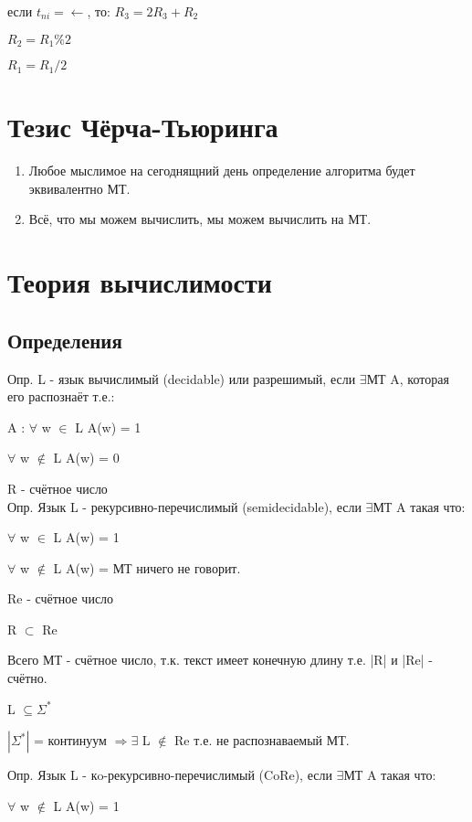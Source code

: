 \documentclass{scrartcl}
\begin{document}
если $t_{ni} = \leftarrow$, то: $R_3 = 2R_3 + R_2$

\hspace*{30mm}$R_2 = R_1 \% 2$

\hspace*{30mm}$R_1 = R_1 / 2$

\section{Тезис Чёрча-Тьюринга}
\begin{enumerate}
\item Любое мыслимое на сегоднящний день определение алгоритма будет эквивалентно МТ.
\item Всё, что мы можем вычислить, мы можем вычислить на МТ.
\end{enumerate}

\section{Теория вычислимости}
\subsection{Определения}

Опр. L - язык вычислимый (decidable) или разрешимый, если $\exists$МТ A, которая его распознаёт т.е.:

A : $\forall$ w $\in$ L A(w) = 1

\hspace*{6,5mm}$\forall$ w $\not\in$ L A(w) = 0

R - счётное число\\
Опр. Язык L - рекурсивно-перечислимый (semidecidable), если $\exists$МТ A такая что:

$\forall$ w $\in$ L A(w) = 1

$\forall$ w $\not\in$ L A(w) = МТ ничего не говорит.

Re - счётное число

R $\subset$ Re

Всего МТ - счётное число, т.к. текст имеет конечную длину т.е. |R| и |Re| - счётно.

L $\subseteq \Sigma^*$ 

$|\Sigma^*|$ = континуум $\Rightarrow \exists$ L $\not\in$ Re т.е. не распознаваемый МТ.

Опр. Язык L - кo-рекурсивно-перечислимый (CoRe), если $\exists$МТ A такая что:

$\forall$ w $\not\in$ L A(w) = 1
\end{document}
